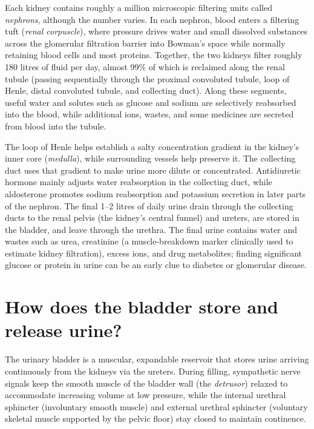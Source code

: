 \documentclass[11pt,oneside]{report}
\begin{document}
Each kidney contains roughly a million microscopic filtering units called
\emph{nephrons}, although the number varies. In each nephron, blood enters a
filtering tuft (\emph{renal corpuscle}), where pressure drives water and small
dissolved substances across the glomerular filtration barrier into Bowman's
space while normally retaining blood cells and most proteins. Together, the two
kidneys filter roughly 180 litres of fluid per day, almost 99\% of which is
reclaimed along the renal tubule (passing sequentially through the proximal
convoluted tubule, loop of Henle, distal convoluted tubule, and collecting
duct). Along these segments, useful water and solutes such as glucose and
sodium are selectively reabsorbed into the blood, while additional ions,
wastes, and some medicines are secreted from blood into the tubule.

The loop of Henle helps establish a salty concentration gradient in the kidney's
inner core (\emph{medulla}), while surrounding vessels help preserve it. The
collecting duct uses that gradient to make urine more dilute or concentrated.
Antidiuretic hormone mainly adjusts water reabsorption in the collecting duct,
while aldosterone promotes sodium reabsorption and potassium secretion in later
parts of the nephron. The final 1--2 litres of daily urine drain through the
collecting ducts to the renal pelvis (the kidney's central funnel) and ureters,
are stored in the bladder, and leave through the urethra. The final urine
contains water and wastes such as urea, creatinine (a muscle-breakdown marker
clinically used to estimate kidney filtration), excess ions, and drug
metabolites; finding significant glucose or protein in urine can be an early
clue to diabetes or glomerular disease.

\section{How does the bladder store and release urine?}

The urinary bladder is a muscular, expandable reservoir that stores urine
arriving continuously from the kidneys via the ureters. During filling,
sympathetic nerve signals keep the smooth muscle of the bladder wall (the
\emph{detrusor}) relaxed to accommodate increasing volume at low pressure, while
the internal urethral sphincter (involuntary smooth muscle) and external
urethral sphincter (voluntary skeletal muscle supported by the pelvic floor)
stay closed to maintain continence.
\end{document}
